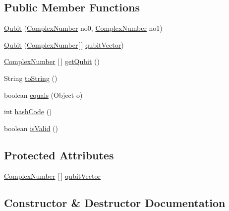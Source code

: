 \subsection*{Public Member Functions}
\begin{DoxyCompactItemize}
\item 
\hyperlink{classcom_1_1ars_1_1qubits_1_1_qubit_a53faaab4aa29083881b330e7f1b14f7e}{Qubit} (\hyperlink{classcom_1_1ars_1_1complexnumbers_1_1_complex_number}{Complex\+Number} no0, \hyperlink{classcom_1_1ars_1_1complexnumbers_1_1_complex_number}{Complex\+Number} no1)
\item 
\hyperlink{classcom_1_1ars_1_1qubits_1_1_qubit_a7dfa895c2fc65d9b8eb535e8161c2bb7}{Qubit} (\hyperlink{classcom_1_1ars_1_1complexnumbers_1_1_complex_number}{Complex\+Number}\mbox{[}$\,$\mbox{]} \hyperlink{classcom_1_1ars_1_1qubits_1_1_qubit_a1ba51c0cf0e774695ef15d630a5060ed}{qubit\+Vector})
\item 
\hyperlink{classcom_1_1ars_1_1complexnumbers_1_1_complex_number}{Complex\+Number} \mbox{[}$\,$\mbox{]} \hyperlink{classcom_1_1ars_1_1qubits_1_1_qubit_a48b2de0bf6b0efc8470d687a239085db}{get\+Qubit} ()
\item 
String \hyperlink{classcom_1_1ars_1_1qubits_1_1_qubit_abd0f4fc61885920dd3c7dde9c968a543}{to\+String} ()
\item 
boolean \hyperlink{classcom_1_1ars_1_1qubits_1_1_qubit_a2070492aa6a39ee06855fdd94566e4d3}{equals} (Object o)
\item 
int \hyperlink{classcom_1_1ars_1_1qubits_1_1_qubit_acc34d826407f3aba4d09c3073d9d7270}{hash\+Code} ()
\item 
boolean \hyperlink{classcom_1_1ars_1_1qubits_1_1_qubit_acd0c96f4ba85205af1647a7f0e2c404a}{is\+Valid} ()
\end{DoxyCompactItemize}
\subsection*{Protected Attributes}
\begin{DoxyCompactItemize}
\item 
\hyperlink{classcom_1_1ars_1_1complexnumbers_1_1_complex_number}{Complex\+Number} \mbox{[}$\,$\mbox{]} \hyperlink{classcom_1_1ars_1_1qubits_1_1_qubit_a1ba51c0cf0e774695ef15d630a5060ed}{qubit\+Vector}
\end{DoxyCompactItemize}


\subsection{Constructor \& Destructor Documentation}
\hypertarget{classcom_1_1ars_1_1qubits_1_1_qubit_a53faaab4aa29083881b330e7f1b14f7e}{}\label{classcom_1_1ars_1_1qubits_1_1_qubit_a53faaab4aa29083881b330e7f1b14f7e} 
